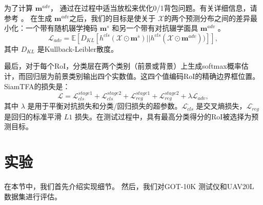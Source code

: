 为了计算 $\mathbf{m}^{adv}$，\cite{park2018adversarial} 通过在过程中适当放松来优化0/1背包问题。有关详细信息，请参考 \cite{park2018adversarial}。
在生成 $\mathbf{m}^{adv}$之后，我们的目标是使关于 $\mathcal{X}$的两个预测分布之间的差异最小化：一个带有随机辍学掩码 $\mathbf{m}^{s}$ 和另一个带有对抗辍学面具 $\mathbf{m}^{adv}$ \cite{lee2019drop}。
\begin{equation}
    \mathcal{L}_{adv} = \mathbb E[D_{KL}[h^{cls}(\mathcal{X} \odot\mathbf{m}^{s})||h^{cls}(\mathcal{X} \odot\mathbf{m}^{adv}))]],
\end{equation}
其中 $D_{KL}$ 是Kullback-Leibler散度。

最后，对于每个RoI，分类层在两个类别（前景或背景）上生成softmax概率估计，而回归层为前景类别输出四个实数值。这四个值编码RoI的精确边界框位置。
SiamTFA的损失是：
\begin{equation}
\mathcal{L} = \mathcal{L}_{cls}^{stage1} + \mathcal{L}_{cls}^{stage2} + \mathcal{L}_{reg}^{stage1}+\mathcal{L}_{reg}^{stage2} +  \lambda \mathcal{L}_{adv},
\end{equation}
其中 $\lambda$ 是用于平衡对抗损失和分类/回归损失的超参数。$\mathcal{L}_{cls}^{\cdot}$ 是交叉熵损失，$\mathcal{L}_{reg}^{\cdot}$ 是回归的标准平滑 $L1$ 损失。在测试过程中，具有最高分类得分的RoI被选择为预测目标。

\section{实验}
在本节中，我们首先介绍实现细节。
然后，我们对GOT-10K \cite{GOT-10k} 测试仪和UAV20L \cite{mueller2016benchmark} 数据集进行评估。

